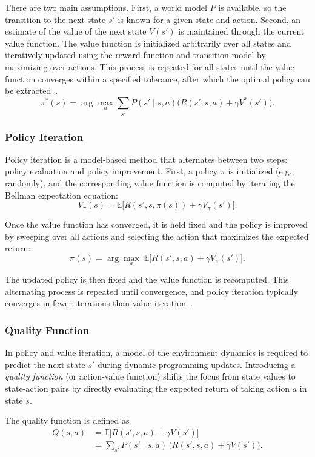 There are two main assumptions. First, a world model \(P\) is available, so the transition to the next state \(s'\) is known for a given state and action. Second, an estimate of the value of the next state \(V(s')\) is maintained through the current value function. The value function is initialized arbitrarily over all states and iteratively updated using the reward function and transition model by maximizing over actions. This process is repeated for all states until the value function converges within a specified tolerance, after which the optimal policy can be extracted~\cite{brunton2022data}.
\[
\pi^*(s) = \arg\max_{a} \sum_{s'} P(s' \mid s, a)
\big( R(s', s, a) + \gamma V^*(s') \big).
\]

\subsubsection{Policy Iteration}
Policy iteration is a model-based method that alternates between two steps: policy evaluation and policy improvement. First, a policy \(\pi\) is initialized (e.g., randomly), and the corresponding value function is computed by iterating the Bellman expectation equation:
\[
V_{\pi}(s) = \mathbb{E}\big[ R(s', s, \pi(s)) + \gamma V_{\pi}(s') \big].
\]

Once the value function has converged, it is held fixed and the policy is improved by sweeping over all actions and selecting the action that maximizes the expected return:
\[
\pi(s) = \arg\max_{a} \; \mathbb{E}\big[ R(s', s, a) + \gamma V_{\pi}(s') \big].
\]

The updated policy is then fixed and the value function is recomputed. This alternating process is repeated until convergence, and policy iteration typically converges in fewer iterations than value iteration~\cite{brunton2022data}.


\subsubsection{Quality Function}
In policy and value iteration, a model of the environment dynamics is required to predict the next state \(s'\) during dynamic programming updates. Introducing a \emph{quality function} (or action-value function) shifts the focus from state values to state-action pairs by directly evaluating the expected return of taking action \(a\) in state \(s\).

The quality function is defined as
\[
\begin{aligned}
Q(s, a)
&= \mathbb{E}\big[ R(s', s, a) + \gamma V(s') \big] \\
&= \sum_{s'} P(s' \mid s, a)\,\bigl(R(s', s, a) + \gamma V(s')\bigr).
\end{aligned}
\]


